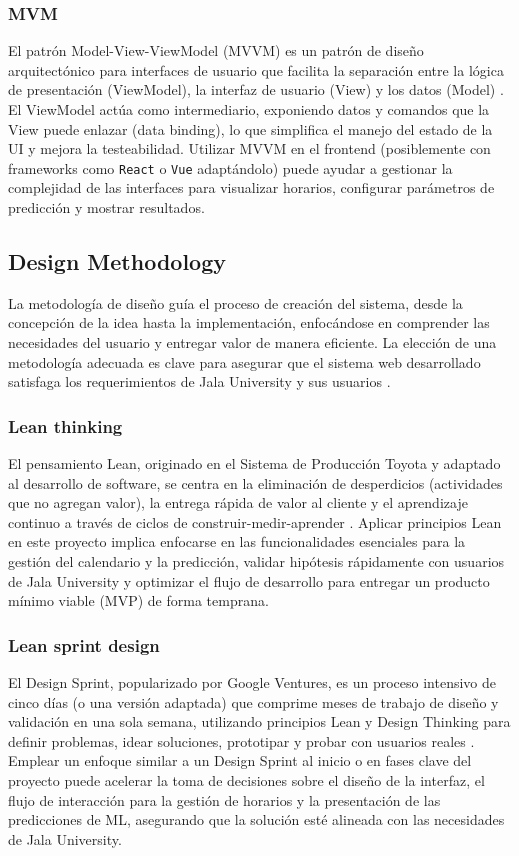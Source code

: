 \subsubsection{MVM}
El patrón Model-View-ViewModel (MVVM) es un patrón de diseño arquitectónico para interfaces de usuario que facilita la separación entre la lógica de presentación (ViewModel), la interfaz de usuario (View) y los datos (Model) \parencite{Smith2005}.
El ViewModel actúa como intermediario, exponiendo datos y comandos que la View puede enlazar (data binding), lo que simplifica el manejo del estado de la UI y mejora la testeabilidad. Utilizar MVVM en el frontend (posiblemente con frameworks como \texttt{React} o \texttt{Vue} adaptándolo) puede ayudar a gestionar la complejidad de las interfaces para visualizar horarios, configurar parámetros de predicción y mostrar resultados.

\subsection{Design Methodology}
La metodología de diseño guía el proceso de creación del sistema, desde la concepción de la idea hasta la implementación, enfocándose en comprender las necesidades del usuario y entregar valor de manera eficiente.
La elección de una metodología adecuada es clave para asegurar que el sistema web desarrollado satisfaga los requerimientos de Jala University y sus usuarios \parencite{Cooper2014}.

\subsubsection{Lean thinking}
El pensamiento Lean, originado en el Sistema de Producción Toyota y adaptado al desarrollo de software, se centra en la eliminación de desperdicios (actividades que no agregan valor), la entrega rápida de valor al cliente y el aprendizaje continuo a través de ciclos de construir-medir-aprender \parencite{WomackJones2003}.
Aplicar principios Lean en este proyecto implica enfocarse en las funcionalidades esenciales para la gestión del calendario y la predicción, validar hipótesis rápidamente con usuarios de Jala University y optimizar el flujo de desarrollo para entregar un producto mínimo viable (MVP) de forma temprana.

\subsubsection{Lean sprint design}
El Design Sprint, popularizado por Google Ventures, es un proceso intensivo de cinco días (o una versión adaptada) que comprime meses de trabajo de diseño y validación en una sola semana, utilizando principios Lean y Design Thinking para definir problemas, idear soluciones, prototipar y probar con usuarios reales \parencite{Knapp2016}.
Emplear un enfoque similar a un Design Sprint al inicio o en fases clave del proyecto puede acelerar la toma de decisiones sobre el diseño de la interfaz, el flujo de interacción para la gestión de horarios y la presentación de las predicciones de ML, asegurando que la solución esté alineada con las necesidades de Jala University.


